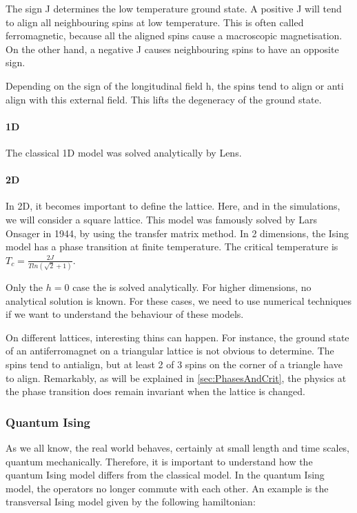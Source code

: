 The sign J determines the low temperature ground state. A positive J will tend to align all neighbouring spins at low temperature. This is often called ferromagnetic, because all the aligned spins cause a macroscopic magnetisation. On the other hand, a negative J causes neighbouring spins to have an opposite sign.

Depending on the sign of the longitudinal field h, the spins tend to align or anti align with this external field. This lifts the degeneracy of the ground state.

\paragraph{1D}

The classical 1D model was solved analytically by Lens. 

\paragraph{2D}

In 2D, it becomes important to define the lattice. Here, and in the simulations, we will consider a square lattice. This model was famously solved by Lars Onsager in 1944, by using the transfer matrix method. In 2 dimensions, the Ising model has a phase transition at finite temperature. The critical temperature is $T_c = \frac{2 J}{T ln( \sqrt{2}+1)}$.

Only the $h=0$ case the is solved analytically. For higher dimensions, no analytical solution is known. For these cases, we need to use numerical techniques if we want to understand the behaviour of these models.

On different lattices, interesting thins can happen. For instance, the ground state of an antiferromagnet on a triangular lattice is not obvious to determine. The spins tend to antialign, but at least 2 of 3 spins on the corner of a triangle have to align. Remarkably, as will be explained in \cref{sec:PhasesAndCrit}, the physics at the phase transition does remain invariant when the lattice is changed.

\subsubsection{Quantum Ising}

As we all know, the real world behaves, certainly at small length and time scales, quantum mechanically. Therefore, it is important to understand how the quantum Ising model differs from the classical model. In the quantum Ising model, the operators no longer commute with each other. An example is the transversal Ising model given by the following hamiltonian:


